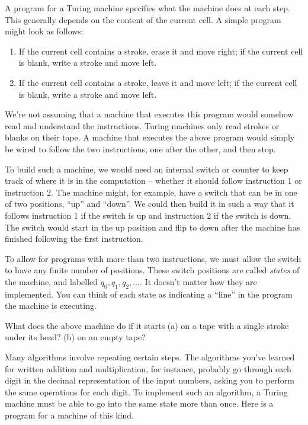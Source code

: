 A program for a Turing machine specifies what the machine does at each step.
This generally depends on the content of the current cell.
A simple program might look as follows:

\begin{enumerate}[itemsep=2pt,parsep=0pt,topsep=6pt,partopsep=2pt, labelwidth=4em,leftmargin=4.5em]
  \item[\emph{Step 1}.] If the current cell contains a stroke, erase it and move right;
        if the current cell is blank, write a stroke and move left.
  \item[\emph{Step 2}.] If the current cell contains a stroke, leave it and move left;
        if the current cell is blank, write a stroke and move left.
\end{enumerate}

We're not assuming that
a machine that executes this program
would somehow read and understand the instructions.
Turing machines only read strokes or blanks on their tape.
A machine that executes the above program
would simply be wired to follow the two instructions,
one after the other,
and then stop.

To build such a machine,
we would need an internal switch or counter
to keep track of where it is in the computation --
whether it should follow instruction 1 or instruction 2.
The machine might,
for example,
have a switch that can be in one of two positions,
``up'' and ``down''.
We could then build it in such a way that
it follows instruction 1 if the switch is up
and instruction 2 if the switch is down.
The switch would start in the up position and flip to down after
the machine has finished following the first instruction.

To allow for programs with more than two instructions,
we must allow the switch to have any finite number of positions.
These switch positions are called \textit{states} of the machine,
and labelled $q_{0}, q_1, q_2, \ldots$.
It doesn't matter how they are implemented.
You can think of each state as indicating a ``line'' in
the program the machine is executing.

\begin{exercise}
  What does the above machine do if it starts
  (a) on a tape with a single stroke under its head?
  (b) on an empty tape?
\end{exercise}

Many algorithms involve repeating certain steps.
The algorithms you've learned for written addition and multiplication,
for instance,
probably go through each digit in the decimal representation of the input numbers,
asking you to perform the same operations for each digit.
To implement such an algorithm,
a Turing machine must be able to go into the same state more than once.
Here is a program for a machine of this kind.

